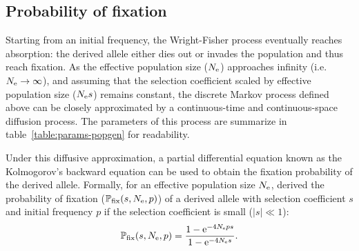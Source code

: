 \subsection{Probability of fixation}

Starting from an initial frequency, the Wright-Fisher process eventually reaches absorption: the derived allele either dies out or invades the population and thus reach fixation.
As the effective population size ($N_{\text{e}}$) approaches infinity (i.e. $ N_{\text{e}} \to \infty$), and assuming that the selection coefficient scaled by effective population size ($N_{\text{e}} s $) remains constant, the discrete Markov process defined above can be closely approximated by a continuous-time and continuous-space diffusion process.
The parameters of this process are summarize in table~\ref{table:params-popgen} for readability.

\begin{table}[H]
    \centering
    \noindent{}
    \caption[Parameters of population genetics]{Parameters of population genetics}\label{table:params-popgen}
\end{table}

Under this diffusive approximation, a partial differential equation known as the Kolmogorov's backward equation can be used to obtain the fixation probability of the derived allele.
Formally, for an effective population size $N_{\text{e}}$, \citet{Kimura1962} derived the probability of fixation ($\mathbb{P}_{\text{fix}}(s, N_{\text{e}}, p)$) of a derived allele with selection coefficient $s$ and initial frequency $p$ if the selection coefficient is small ($|s| \ll 1$):
\begin{equation}
    \mathbb{P}_{\text{fix}}(s, N_{\text{e}}, p) = \dfrac{1 - \text{e}^{-4 N_{\text{e}} p s }}{1 - \text{e}^{-4 N_{\text{e}} s}}.
\end{equation}

